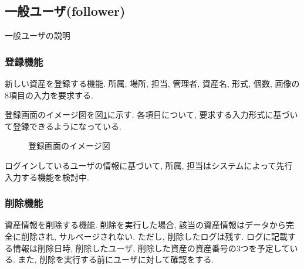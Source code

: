 \documentclass[11ptm]{jsarticle}
\begin{document}
\clearpage
\subsection{一般ユーザ(follower)}
\label{subsec:一般ユーザ(follower)}
一般ユーザの説明

\subsubsection{登録機能}
\label{subsec:登録機能}
新しい資産を登録する機能. 所属, 場所, 担当, 管理者, 資産名, 形式, 個数, 画像の8項目の入力を要求する. \par
登録画面のイメージ図を図\ref{fig:登録画面のイメージ図}に示す. 各項目について, 要求する入力形式に基づいて登録できるようになっている.
\begin{figure}[h]
  \centering
  \caption{\label{fig:登録画面のイメージ図}登録画面のイメージ図}
\end{figure}\par
ログインしているユーザの情報に基づいて, 所属, 担当はシステムによって先行入力する機能を検討中.

\subsubsection{削除機能}
\label{subsec:削除機能}
資産情報を削除する機能. 削除を実行した場合, 該当の資産情報はデータから完全に削除され, サルベージされない. ただし, 削除したログは残す. ログに記載する情報は削除日時, 削除したユーザ, 削除した資産の資産番号の3つを予定している. また, 削除を実行する前にユーザに対して確認をする.

\clearpage
\end{document}
